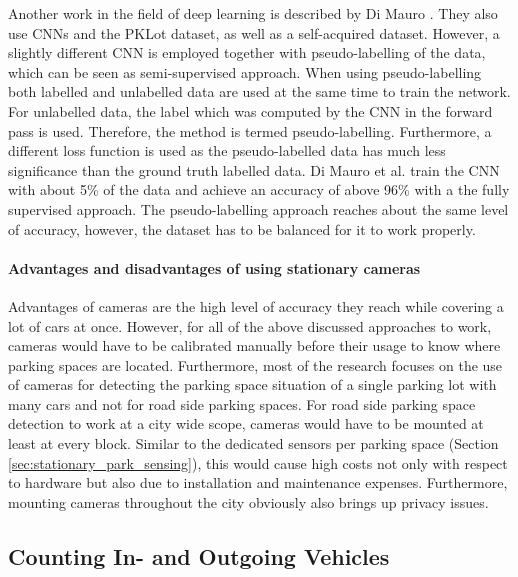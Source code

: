 Another work in the field of deep learning is described by Di Mauro \cite{DiMauro2016}. They also use CNNs and the PKLot dataset, as well as a self-acquired dataset. However, a slightly different CNN is employed together with pseudo-labelling of the data, which can be seen as semi-supervised approach. When using pseudo-labelling both labelled and unlabelled data are used at the same time to train the network. For unlabelled data, the label which was computed by the CNN in the forward pass is used. Therefore, the method is termed pseudo-labelling. Furthermore, a different loss function is used as the pseudo-labelled data has much less significance than the ground truth labelled data. Di Mauro et al. train the CNN with about 5\% of the data and achieve an accuracy of above 96\% with a the fully supervised approach. The pseudo-labelling approach reaches about the same level of accuracy, however, the dataset has to be balanced for it to work properly.


\paragraph{Advantages and disadvantages of using stationary cameras}

Advantages of cameras are the high level of accuracy they reach while covering a lot of cars at once. However, for all of the above discussed approaches to work, cameras would have to be calibrated manually before their usage to know where parking spaces are located. Furthermore, most of the research focuses on the use of cameras for detecting the parking space situation of a single parking lot with many cars and not for road side parking spaces. For road side parking space detection to work at a city wide scope, cameras would have to be mounted at least at every block. Similar to the dedicated sensors per parking space (Section \ref{sec:stationary_park_sensing}), this would cause high costs not only with respect to hardware but also due to installation and maintenance expenses. Furthermore, mounting cameras throughout the city obviously also brings up privacy issues.





\subsection{Counting In- and Outgoing Vehicles}
\label{sec:counting_in_out_park_sensing}

